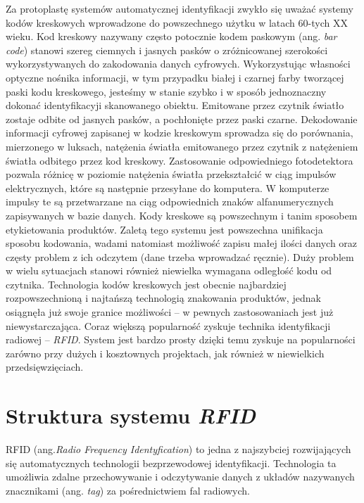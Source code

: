 Za protoplastę systemów automatycznej identyfikacji zwykło się uważać systemy kodów kreskowych wprowadzone do powszechnego użytku w latach 60-tych XX wieku.
Kod kreskowy nazywany często potocznie kodem paskowym (ang. \emph{bar code}) stanowi szereg ciemnych i jasnych pasków o zróżnicowanej szerokości wykorzystywanych do zakodowania danych cyfrowych. Wykorzystując własności optyczne nośnika informacji, w tym przypadku białej i czarnej farby tworzącej paski kodu kreskowego, jesteśmy w stanie szybko i w sposób jednoznaczny dokonać identyfikacyji skanowanego obiektu. Emitowane przez czytnik światło zostaje odbite od jasnych pasków, a pochłonięte przez paski czarne. Dekodowanie informacji cyfrowej zapisanej w kodzie kreskowym sprowadza się do porównania, mierzonego w luksach, natężenia światła emitowanego przez czytnik z natężeniem światła odbitego przez kod kreskowy. Zastosowanie odpowiedniego fotodetektora pozwala różnicę w poziomie natężenia światła przekształcić w ciąg impulsów elektrycznych, które są następnie przesyłane do komputera. W komputerze impulsy te są przetwarzane na ciąg odpowiednich znaków alfanumerycznych zapisywanych w bazie danych. 
Kody kreskowe są powszechnym i tanim sposobem etykietowania produktów. Zaletą tego systemu jest powszechna unifikacja sposobu kodowania, wadami natomiast możliwość zapisu małej ilości danych  oraz częsty problem z ich odczytem (dane trzeba wprowadzać ręcznie). Duży problem w wielu sytuacjach stanowi również niewielka wymagana odległość kodu od czytnika. 
Technologia kodów kreskowych jest obecnie najbardziej rozpowszechnioną i najtańszą technologią znakowania produktów, jednak osiągnęła już swoje granice możliwości – w pewnych zastosowaniach jest już niewystarczająca.
Coraz większą popularność zyskuje technika identyfikacji radiowej – \emph{RFID}. System jest bardzo prosty dzięki temu zyskuje na popularności zarówno przy dużych i kosztownych projektach, jak również w niewielkich przedsięwzięciach.

\section{Struktura systemu \emph{RFID}}

RFID (ang.\emph {Radio Frequency  Identyfication}) to jedna z najszybciej rozwijających  się automatycznych technologii bezprzewodowej  identyfikacji. Technologia ta umożliwia zdalne przechowywanie i odczytywanie danych z układów nazywanych znacznikami (ang. \emph{tag}) za pośrednictwiem fal radiowych. 

